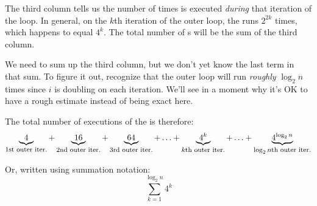 \begin{prob}
\begin{soln}
        The third column tells us the number of times  is
        executed \emph{during} that iteration of the  loop. In
        general, on the $k$th iteration of the outer loop, the 
        runs $2^{2k}$ times, which happens to equal $4^k$. The total number of
        s will be the sum of the third column.

        We need to sum up the third column, but we don't yet know the last term
        in that sum. To figure it out, recognize that the outer loop will run
        \emph{roughly} $\log_2 n$ times since $i$ is doubling on each
        iteration. We'll see in a moment why it's OK to have a rough estimate
        instead of being exact here.

        The total number of executions of the  is therefore:
        \[
            \underbrace{4}_{\text{\footnotesize 1st outer iter.}}
            +
            \underbrace{16}_{\text{\footnotesize 2nd outer iter.}}
            +
            \underbrace{64}_{\text{\footnotesize 3rd outer iter.}}
            +
            \ldots
            +
            \underbrace{4^{k}}_{\text{\footnotesize $k$th outer iter.}}
            +
            \ldots
            +
            \underbrace{4^{\log_2 n}}_{\text{\footnotesize $\log_2 n$th outer iter.}}
        \]

        Or, written using summation notation:
        \[
            \sum_{k=1}^{\log_2 n} 4^k
        \]


\end{soln}
\end{prob}

